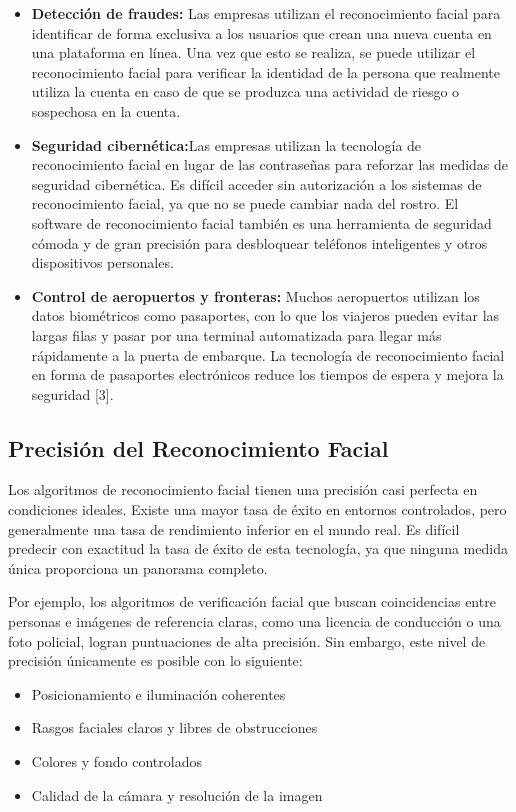 \begin{itemize}
  \item \textbf{Detección de fraudes:} Las empresas utilizan el reconocimiento facial para identificar de forma
exclusiva a los usuarios que crean una nueva cuenta en una plataforma en
línea. Una vez que esto se realiza, se puede utilizar el reconocimiento facial
para verificar la identidad de la persona que realmente utiliza la cuenta en
caso de que se produzca una actividad de riesgo o sospechosa en la cuenta.
  \item \textbf{Seguridad cibernética:}Las empresas utilizan la tecnología de reconocimiento facial en lugar de
las contraseñas para reforzar las medidas de seguridad cibernética. Es difícil
acceder sin autorización a los sistemas de reconocimiento facial, ya que no se
puede cambiar nada del rostro. El software de reconocimiento facial también
es una herramienta de seguridad cómoda y de gran precisión para desbloquear
teléfonos inteligentes y otros dispositivos personales.
  \item \textbf{Control de aeropuertos y fronteras:} Muchos aeropuertos utilizan los datos biométricos como pasaportes, con lo
que los viajeros pueden evitar las largas filas y pasar por una terminal automatizada para llegar más rápidamente a la puerta de embarque. La tecnología de
reconocimiento facial en forma de pasaportes electrónicos reduce los tiempos de espera y mejora la seguridad [3].
\end{itemize}


\subsection{Precisión del Reconocimiento Facial}

Los algoritmos de reconocimiento facial tienen una precisión casi perfecta
en condiciones ideales. Existe una mayor tasa de éxito en entornos controlados,
pero generalmente una tasa de rendimiento inferior en el mundo real. Es difícil
predecir con exactitud la tasa de éxito de esta tecnología, ya que ninguna
medida única proporciona un panorama completo.


Por ejemplo, los algoritmos de verificación facial que buscan coincidencias
entre personas e imágenes de referencia claras, como una licencia de conducción
o una foto policial, logran puntuaciones de alta precisión. Sin embargo, este
nivel de precisión únicamente es posible con lo siguiente:


\begin{itemize}
  \item Posicionamiento e iluminación coherentes
  \item Rasgos faciales claros y libres de obstrucciones
  \item Colores y fondo controlados
  \item Calidad de la cámara y resolución de la imagen
\end{itemize}

